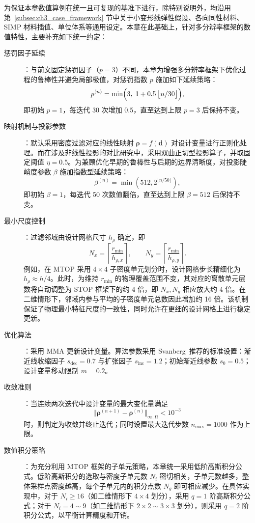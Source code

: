 为保证本章数值算例在统一且可复现的基准下进行，除特别说明外，均沿用第~\ref{subsec:ch3_case_framework} 节中关于小变形线弹性假设、各向同性材料、SIMP 材料插值、单位体系等通用设定。本章在此基础上，针对多分辨率框架的数值特性，主要补充如下统一约定：
\begin{description}
	\item [惩罚因子延续]：与前文固定惩罚因子（$p=3$）不同，本章为增强多分辨率框架下优化过程的鲁棒性并避免局部极值，对惩罚指数 $p$ 施加如下延续策略：
	\[
	p^{(n)}=\min\Bigl(3,\; 1+0.5\,\bigl\lfloor n/30 \bigr\rfloor \Bigr),
	\]
	即初始 $p=1$，每迭代 30 次增加 0.5，直至达到上限 $p=3$ 后保持不变。
	
	\item [映射机制与投影参数]：默认采用密度过滤对应的线性映射 $\boldsymbol{\rho} = f(\boldsymbol{d})$ 对设计变量进行正则化处理。而在涉及非线性投影的对比研究中，采用双曲正切型投影算子，并取固定阈值 $\eta=0.5$。为兼顾优化早期的鲁棒性与后期的边界清晰度，对投影陡峭度参数 $\beta$ 施加指数型延续策略：
	\[
	\beta^{(n)} = \min\left(512, 2^{\lfloor n/50 \rfloor} \right),
	\]
	即初始 $\beta=1$，每迭代 50 次数值翻倍，直至达到上限 $\beta=512$ 后保持不变。
	
	\item [最小尺度控制]：过滤邻域由设计网格尺寸 $h_\rho$ 确定，即
	\[
	N_x=\left\lceil \frac{r_{\min}}{h_{\rho,x}} \right\rceil,\qquad  N_y=\left\lceil \frac{r_{\min}}{h_{\rho,y}} \right\rceil.
	\]
	例如，在 MTOP 采用 $4\times4$ 子密度单元划分时，设计网格步长精细化为 $h_\rho\approx h/4$。此时，为维持 $r_{\min}$ 的物理覆盖范围不变，其对应的离散单元层数将自动调整为 STOP 框架下的约 4 倍，即 $N_x,N_y$ 相应放大约 4 倍。在二维情形下，邻域内参与平均的子密度单元总数因此增加约 16 倍。该机制保证了物理最小特征尺度的一致性，同时允许在更细的设计网格上进行稳定更新。
	
	\item [优化算法]：采用 MMA 更新设计变量。算法参数采用 Svanberg~\cite{svanbergMmaGcmmaVersions2007a}推荐的标准设置：渐近线收缩因子 $s_{\text{dec}}=0.7$ 与扩张因子 $s_{\text{inc}}=1.2$；初始渐近线参数 $s_0=0.5$；设计变量移动限制 $m=0.2$。
	
	\item [收敛准则]：当连续两次迭代中设计变量的最大变化量满足
	\[
	\Vert\boldsymbol{\rho}^{(n+1)} - \boldsymbol{\rho}^{(n)}\Vert_{\infty,\Omega} < 10^{-3}
	\]
	时，则判定为收敛并终止迭代；同时设置最大迭代步数 $n_{\max}=1000$ 作为上限。
	
	\item [数值积分策略]：为充分利用 MTOP 框架的子单元策略，本章统一采用低阶高斯积分公式。低阶高斯积分的选取与密度子单元数 $N_i$ 密切相关，子单元数越多，整体采样点密度越高，每个子单元内的积分点数 $N_g$ 即可相应减少。在具体实现中，对于 $N_i\geq16$（如二维情形下 $4\times4$ 划分），采用 $q=1$ 阶高斯积分公式；对于 $N_i=4\sim9$（如二维情形下 $2\times2\sim3\times3$ 划分），则采用 $q=2$ 阶积分公式，以平衡计算精度和开销。
\end{description}


